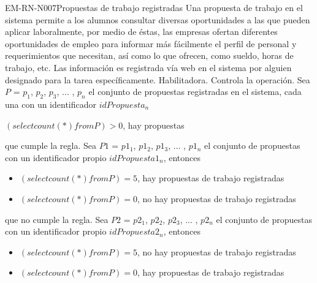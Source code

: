 \begin{BussinesRule}{EM-RN-N007}{Propuestas de trabajo registradas}
	\BRitem[Descripción:] Una propuesta de trabajo en el sistema permite a los alumnos consultar diversas oportunidades a las que pueden aplicar laboralmente, por medio de éstas, las empresas ofertan diferentes oportunidades de empleo para informar más fácilmente el perfil de personal y requerimientos que necesitan, así como lo que ofrecen, como sueldo, horas de trabajo, etc. Las información es registrada vía web en el sistema por alguien designado para la tarea específicamente. 
	\BRitem[Tipo:] Habilitadora.
	\BRitem[Nivel:] Controla la operación.
	\BRitem[Sentencia: ] Sea $P$ = {$p_{1}$, $p_{2}$, $p_{3}$, ... , $p_{n}$} el conjunto de propuestas registradas en el sistema, cada una con un identificador $idPropuesta_{n}$  
	\begin{center}
		$(select count(*) from P) > 0$, hay propuestas
	\end{center}
	
	 que cumple la regla.
		Sea $P1$ = {$p1_{1}$, $p1_{2}$, $p1_{3}$, ... , $p1_{n}$} el conjunto de propuestas con un identificador propio $idPropuesta1_{n}$, entonces 
		\begin{itemize}
			\item $(select count(*) from P) = 5$, hay propuestas de trabajo registradas 
			\item $(select count(*) from P) = 0$, no hay propuestas de trabajo registradas 
		\end{itemize}
	 que no cumple la regla.
		Sea $P2$ = {$p2_{1}$, $p2_{2}$, $p2_{3}$, ... , $p2_{n}$} el conjunto de propuestas con un identificador propio $idPropuesta2_{n}$, entonces 
		\begin{itemize}
			\item $(select count(*) from P) = 5$, no hay propuestas de trabajo registradas 
			\item $(select count(*) from P) = 0$, hay propuestas de trabajo registradas 
		\end{itemize}
\end{BussinesRule}

